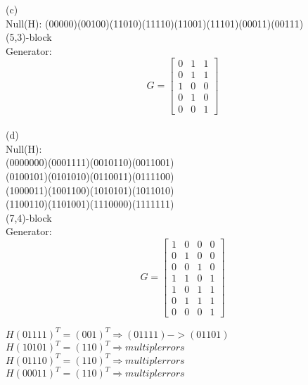\documentclass[a4paper, justified]{tufte-handout}
\begin{document}
\begin{problem}[TJ 8-7(c,d)]
\end{problem}

\begin{solution}
  (c)\\
  Null(H):
  (00000)(00100)(11010)(11110)(11001)(11101)(00011)(00111)\\
  (5,3)-block\\
  Generator:\\
  $$
    G=\left[\begin{array}{lll}
        0 & 1 & 1 \\
        0 & 1 & 1 \\
        1 & 0 & 0 \\
        0 & 1 & 0 \\
        0 & 0 & 1
      \end{array}\right]
  $$\\
  (d)\\
  Null(H):\\
  (0000000)(0001111)(0010110)(0011001)\\
  (0100101)(0101010)(0110011)(0111100)\\
  (1000011)(1001100)(1010101)(1011010)\\
  (1100110)(1101001)(1110000)(1111111)\\
  (7,4)-block\\
  Generator:
  $$
    G=\left[\begin{array}{llll}
        1 & 0 & 0 & 0 \\
        0 & 1 & 0 & 0 \\
        0 & 0 & 1 & 0 \\
        1 & 1 & 0 & 1 \\
        1 & 0 & 1 & 1 \\
        0 & 1 & 1 & 1 \\
        0 & 0 & 0 & 1
      \end{array}\right]
  $$
\end{solution}

\begin{problem}[TJ 8-9]
\end{problem}

\begin{solution}
  $H(01111)^T=(001)^T\Rightarrow (01111)->(01101)$\\
  $H(10101)^T=(110)^T\Rightarrow multipl errors$\\
  $H(01110)^T=(110)^T\Rightarrow multipl errors$\\
  $H(00011)^T=(110)^T\Rightarrow multipl errors$\\
\end{solution}
\end{document}
